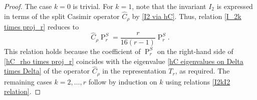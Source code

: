 \documentclass[a4paper]{article}
\newcommand{\hC}{\widehat{C}}
\renewcommand{\=}{\ =\ }
\DeclareMathOperator{\proj}{P}
\numberwithin{equation}{section}
\theoremstyle{remark}
\begin{document}
\begin{proof}
The case $k=0$ is trivial. For $k=1$, note that the invariant $I_2$ is expressed in terms of the split Casimir operator $\hC_\rho$ by \eqref{I2 via hC}. Thus, relation \eqref{I_2k times proj_r} reduces to
\begin{equation}\label{hC_rho times proj_r}
\hC_\rho\proj_r^S = \frac{r}{16(r-1)} \proj_r^S.
\end{equation}
This relation holds because the coefficient of $\proj_r^S$ on the right-hand side of \eqref{hC_rho times proj_r} coincides with the eigenvalue \eqref{hC eigenvalues on Delta times Delta} of the operator $\hC_\rho$ in the representation $T_r$, as required. The remaining cases $k=2,\dots,r$ follow by induction on $k$ using relations \eqref{I2kI2 relation}.
\end{proof}
\end{document}
